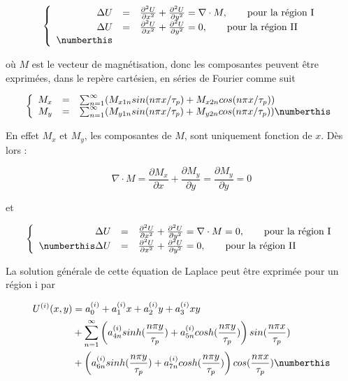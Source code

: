 \[
\left\{
\begin{array}{r c l}
\Delta U &=& \frac{\partial^2U}{\partial x^2}+\frac{\partial^2U}{\partial y^2} = \nabla\cdot M, \qquad \text{pour la région I}\\
\Delta U &=& \frac{\partial^2U}{\partial x^2}+\frac{\partial^2U}{\partial y^2} = 0, \qquad \text{pour la région II}\\ \numberthis
\end{array}
\right.
\] 


où $M$ est le vecteur de magnétisation, donc les composantes peuvent être exprimées, dans le repère cartésien, en séries de Fourier comme suit

\[
\left\{
\begin{array}{r c l}
M_x &=& \sum_{n=1}^\infty(M_{x1n}sin(n\pi x/\tau_p)+M_{x2n}cos(n\pi x/\tau_p))\\
M_y &=& \sum_{n=1}^\infty(M_{y1n}sin(n\pi x/\tau_p)+M_{y2n}cos(n\pi x/\tau_p))\numberthis
\end{array}
\right.
\]



En effet $M_x$ et $M_y$, les composantes de $M$, sont uniquement fonction de $x$. Dès lors :

\begin{equation}
    \nabla\cdot M = \frac{\partial M_x}{\partial x}+\frac{\partial M_y}{\partial y} = \frac{\partial M_y}{\partial y} = 0
\end{equation}

et

\[
\left\{
\begin{array}{r c l}
\Delta U &=& \frac{\partial^2U}{\partial x^2}+\frac{\partial^2U}{\partial y^2} = \nabla\cdot M=0, \qquad \text{pour la région I}\\ \numberthis
\Delta U &=& \frac{\partial^2U}{\partial x^2}+\frac{\partial^2U}{\partial y^2} = 0, \qquad \text{pour la région II}\\ 
\end{array}
\right.
\]

La solution générale de cette équation de Laplace peut être exprimée pour un région i par 

\begin{align*}
    U^{(i)}(x,y) &= a_0^{(i)}+a_1^{(i)}x+a_2^{(i)}y+a_3^{(i)}xy\\
    &+\sum_{n=1}^\infty \left(a_{4n}^{(i)}sinh(\frac{n\pi y}{\tau_p})+a_{5n}^{(i)}cosh(\frac{n\pi y}{\tau_p})\right)sin(\frac{n\pi x}{\tau_p})\\
    &+ \left(a_{6n}^{(i)}sinh(\frac{n\pi y}{\tau_p})+a_{7n}^{(i)}cosh(\frac{n\pi y}{\tau_p})\right)cos(\frac{n\pi x}{\tau_p})\numberthis
\end{align*}


